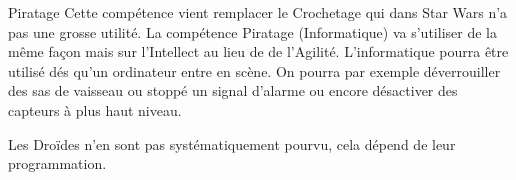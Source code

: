 \newpage
\begin{paperbox}{Piratage}
    Cette compétence vient remplacer le Crochetage qui dans Star Wars n’a pas une grosse utilité. La compétence Piratage (Informatique) va s’utiliser de la même façon mais sur l’Intellect au lieu de de l’Agilité. L’informatique pourra être utilisé dés qu’un ordinateur entre en scène. On pourra par exemple déverrouiller des sas de vaisseau ou stoppé un signal d’alarme ou encore désactiver des capteurs à plus haut niveau.

    Les Droïdes n’en sont pas systématiquement pourvu, cela dépend de leur programmation.
\end{paperbox}
